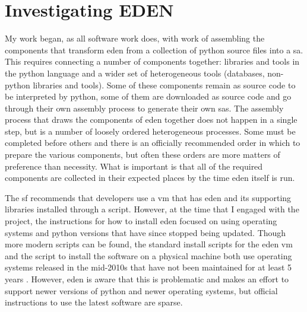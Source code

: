 \documentclass[a4paper,man,natbib,floatsintext]{apa6}
\begin{document}
  \section{Investigating EDEN}
   My work began, as all software work does, with work of assembling the components that transform \acrshort{eden} from a collection of \gls{python} source files into a \gls{sa}. This requires connecting a number of components together: libraries and tools in the \Gls{python} language and a wider set of heterogeneous tools (databases, non-\gls{python} libraries and tools). Some of these components remain as source code to be interpreted by \gls{python}, some of them are downloaded as source code and go through their own assembly process to generate their own \glspl{sa}. The assembly process that draws the components of \acrshort{eden} together does not happen in a single step, but is a number of loosely ordered heterogeneous processes. Some must be completed before others and there is an officially recommended order in which to prepare the various components, but often these orders are more matters of preference than necessity. What is important is that all of the required components are collected in their expected places by the time \acrshort{eden} itself is run. 

   The \gls{sf} recommends that developers use a \gls{vm} that has \acrshort{eden} and its supporting libraries installed through a script. However, at the time that I engaged with the project, the instructions for how to install \acrshort{eden} focused on using operating systems and \gls{python} versions that have since stopped being updated. Though more modern scripts can be found, the standard install scripts for the \acrshort{eden} \gls{vm} and the script to install the software on a physical machine both use operating systems released in the mid-2010s that have not been maintained for at least 5 years \citep{Canonical2020-ru}. However, \acrshort{eden} is aware that this is problematic and makes an effort to support newer versions of \gls{python} and newer operating systems, but official instructions to use the latest software are sparse.
\end{document}

